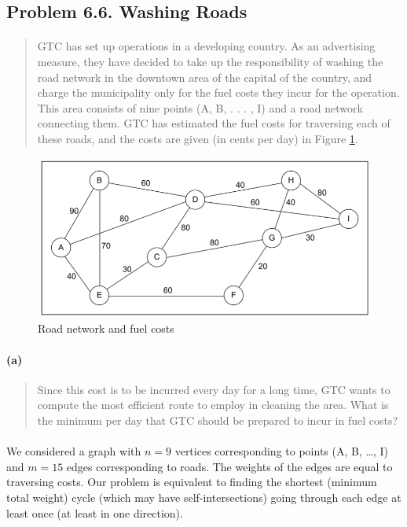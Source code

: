 \subsection{Problem 6.6. Washing Roads}

\paragraph{}
\begin{quote}
GTC has set up operations in a developing country. As an advertising measure, they have decided to take up the responsibility of washing the road network in the downtown area of the capital of the country, and charge the municipality only for the fuel costs they incur for the operation. This area consists of nine points (A, B, . . . , I) and a road network connecting them. GTC has estimated the fuel costs for traversing each of these roads, and the costs are given (in \texteuro cents per day) in Figure \ref{figure6-24}.
\end{quote}

\begin{figure}[H]
	\centering
	\includegraphics[scale=1]{./img/figure6-24.png}
	\caption{Road network and fuel costs}
	\label{figure6-24}
\end{figure}

\paragraph{(a)}
\begin{quote}
Since this cost is to be incurred every day for a long time, GTC wants to compute the most efficient route to employ in cleaning the area. What is the minimum per day that GTC should be prepared to incur in fuel costs?
\end{quote}

\paragraph{}
We considered a graph with $n=9$ vertices corresponding to points (A, B, \dots, I) and $m=15$ edges corresponding to roads. The weights of the edges are equal to traversing costs. Our problem is equivalent to finding the shortest (minimum total weight) cycle (which may have self-intersections) going through each edge at least once (at least in one direction).

